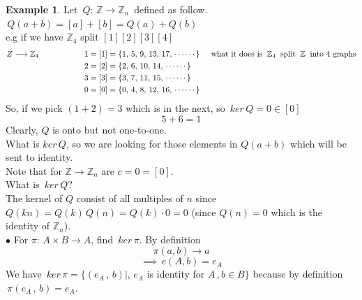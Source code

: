 \documentclass[11pt,a4paper]{article}
\theoremstyle{definition}
\newtheorem{exa}[thm]{Example}
\begin{document}
\begin{exa}
Let $\, Q:\, \mathbb{Z}\longrightarrow \mathbb{Z}_n\,$ defined as follow. $\,Q(a  + b) = [a] + [b] = Q(a) + Q(b)$\\

e.g if we have $\mathbb{Z}_4$ split $[1][2][3][4]$
\begin{align*}
Z\longrightarrow \mathbb{Z}_4\hspace{2cm} 1 & = [1] = \{1,\, 5,\, 9,\, 13,\, 17,\, \cdots\cdots\}\hspace{0.5cm}\text{what it does is}\hspace{0.2cm}\mathbb{Z}_4\hspace{0.2cm}\text{split}\hspace{0.2cm}\mathbb{Z}\hspace{0.2cm}\text{into 4 graphs}\\
2 & = [2] = \{2, \, 6,\, 10,\, 14,\, \cdots\cdots\}\\
3 & = [3] = \{3,\, 7,\, 11,\, 15,\, \cdots\cdots\}\\
0 & = [0] = \{0,\, 4,\, 8,\, 12,\, 16,\, \cdots\cdots\}
\end{align*}
So, if we pick $(1 + 2) = 3$ which is in the next, so $\, ker\, Q = 0\in [0]$ $$5 + 6 = 1$$
Clearly, $Q$ is onto but not one-to-one.\\

What is $ker\, Q$, so we are looking for those elements in $Q(a + b)$ which will be sent to identity.\\
Note that for $\mathbb{Z}\longrightarrow \mathbb{Z}_n$ are $c  = 0 = [0]$.\\
What is $\, ker\, Q$?\\
The kernel of $Q$ consist of all multiples of $n$ since $Q(kn) = Q(k)\,Q(n) = Q(k)\cdot 0 = 0$ (since $Q(n) = 0$ which is the identity of $\mathbb{Z}_n$).\\


$\bullet$ For $\pi :\, A\times B \longrightarrow A$, find $\, ker\, \pi$. By definition
$$\pi (a,b)\longrightarrow a$$
$$\implies\, e(A,b) = e_A$$
We have $\, ker\, \pi = \big\{(e_A\, , \, b)\big|,\, e_A$ is identity for $A\, , b\in B\big\}$ because by definition $\, \pi(e_A\, , \, b) = e_A$.\\\\
\end{exa}
\end{document}
